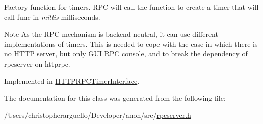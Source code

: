 Factory function for timers. R\+PC will call the function to create a timer that will call func in {\itshape millis} milliseconds. \begin{DoxyNote}{Note}
As the R\+PC mechanism is backend-\/neutral, it can use different implementations of timers. This is needed to cope with the case in which there is no H\+T\+TP server, but only G\+UI R\+PC console, and to break the dependency of rpcserver on httprpc. 
\end{DoxyNote}


Implemented in \mbox{\hyperlink{class_h_t_t_p_r_p_c_timer_interface_a20f33383f0462c4898cc7c9641dc7fa7}{H\+T\+T\+P\+R\+P\+C\+Timer\+Interface}}.



The documentation for this class was generated from the following file\+:\begin{DoxyCompactItemize}
\item 
/\+Users/christopherarguello/\+Developer/anon/src/\mbox{\hyperlink{rpcserver_8h}{rpcserver.\+h}}\end{DoxyCompactItemize}
